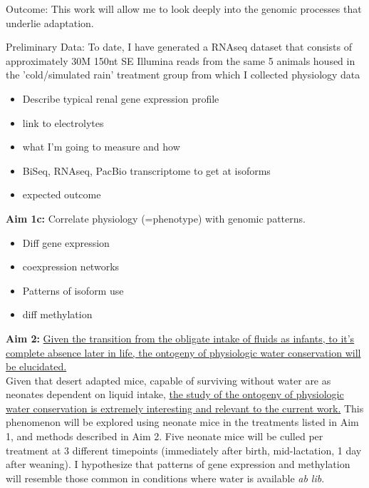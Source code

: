 \documentclass[11pt]{article}
\begin{document}
Outcome: This work will allow me to look deeply into the genomic processes that underlie adaptation. 

Preliminary Data: To date, I have generated a RNAseq dataset that consists of approximately 30M 150nt SE Illumina reads from the same 5 animals housed in the 'cold/simulated rain' treatment group from which I collected physiology data


\begin{itemize}
\item Describe typical renal gene expression profile
\item link to electrolytes
\item what I'm going to measure and how
\item BiSeq, RNAseq, PacBio transcriptome to get at isoforms
\item expected outcome
\end{itemize}



\noindent \textbf{Aim 1c:} Correlate physiology (=phenotype) with genomic patterns. \\

\begin{itemize}
\item Diff gene expression
\item coexpression networks
\item Patterns of isoform use
\item diff methylation
\end{itemize}





\noindent \textbf{Aim 2:} \ul{Given the transition from the obligate intake of fluids as infants, to it’s complete absence later in life, the ontogeny of physiologic water conservation will be elucidated.} \\

Given that desert adapted mice, capable of surviving without water are as neonates dependent on liquid intake, \ul{the study of the ontogeny of physiologic water conservation is extremely interesting and relevant to the current work.} This phenomenon will be explored using neonate mice in the treatments listed in Aim 1, and methods described in Aim 2. Five neonate mice will be culled per treatment at 3 different timepoints (immediately after birth, mid-lactation, 1 day after weaning). I hypothesize that patterns of gene expression and methylation will resemble those common in conditions where water is available \textit{ab lib}.  \\
\end{document}
